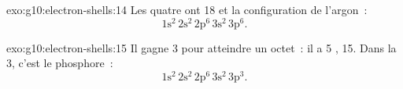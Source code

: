 \begin{solution}{exo:g10:electron-shells:14}
Les quatre ont 18  et la configuration de l'argon~:
\[ 1\mathrm{s}^2\,2\mathrm{s}^2\,2\mathrm{p}^6\,3\mathrm{s}^2\,3\mathrm{p}^6. \]
\end{solution}

\begin{solution}{exo:g10:electron-shells:15}
Il gagne 3  pour atteindre un octet~: il a 5 ,  15. Dans la  3, c'est le phosphore~:
\[ 1\mathrm{s}^2\,2\mathrm{s}^2\,2\mathrm{p}^6\,3\mathrm{s}^2\,3\mathrm{p}^3. \]
\end{solution}

